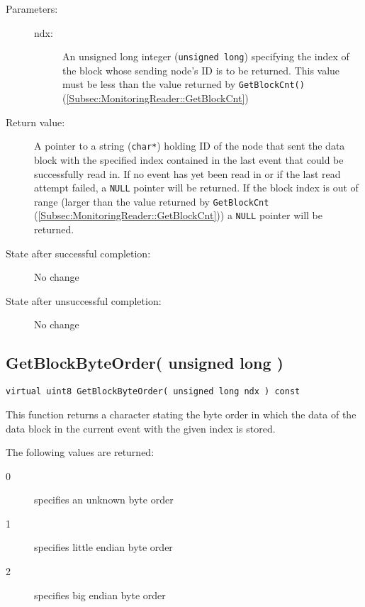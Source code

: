 \documentclass[a4paper,twoside]{article}
\begin{document}
\begin{description}
\item[Parameters:]
	\begin{description}
		\item[ndx:] An unsigned long integer (\texttt{unsigned long}) specifying the index of the block whose sending node's ID is 
		to be returned. This value must be less than the value returned by \texttt{GetBlockCnt()} (\ref{Subsec:MonitoringReader::GetBlockCnt})
	\end{description}
\item[Return value:] A pointer to a string (\texttt{char*}) holding ID of the node that sent the data block
with the specified index contained in the last event that could be successfully read in. 
If no event has yet been read in or if the last read attempt failed, a \texttt{NULL} pointer will be returned.
If the block index is out of range (larger than the value returned by \texttt{GetBlockCnt} (\ref{Subsec:MonitoringReader::GetBlockCnt}))
a \texttt{NULL} pointer will be returned.
\item[State after successful completion:] No change
\item[State after unsuccessful completion:] No change
\end{description}

\subsection{GetBlockByteOrder( unsigned long )}
\label{Subsec:MonitoringReader::GetBlockByteOrder}
\texttt{virtual uint8 GetBlockByteOrder( unsigned long ndx ) const}

This function returns a character stating the byte order in which the data of the data block in the current event
with the given index is stored. 

The following values are returned:
\begin{description}
\item[0] specifies an unknown byte order
\item[1] specifies little endian byte order
\item[2] specifies big endian byte order
\end{description}
\end{document}
